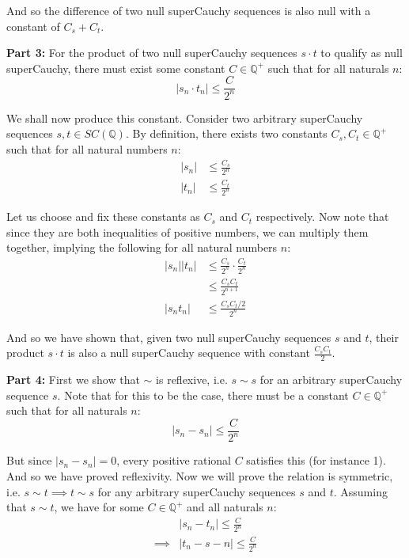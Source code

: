 \documentclass{article}
\begin{document}
And so the difference of two null superCauchy sequences is also null with a constant of $C_s+C_t$.
\bigskip

\noindent\textbf{Part 3:}  For the product of two null superCauchy sequences $s\cdot t$ to qualify as null superCauchy, there must exist some constant $C\in\mathbb Q^+$ such that for all naturals $n$:
\begin{equation*}
    |s_n\cdot t_n|\le\frac{C}{2^n}
\end{equation*}

We shall now produce this constant. Consider two arbitrary superCauchy sequences $s,t\in SC(\mathbb Q)$. By definition, there exists two constants $C_s,C_t\in\mathbb Q^+$ such that for all natural numbers $n$:
\setcounter{equation}{0}
\begin{align}
    |s_n|&\le\frac{C_s}{2^n}\\
    |t_n|&\le\frac{C_t}{2^n}
\end{align}

Let us choose and fix these constants as $C_s$ and $C_t$ respectively. Now note that since they are both inequalities of positive numbers, we can multiply them together, implying the following for all natural numbers $n$:
\begin{align*}
    |s_n||t_n|&\le\frac{C_s}{2^n}\cdot\frac{C_t}{2^n}\tag{product of (1) and (2)}\\
    &\le\frac{C_sC_t}{2^{n+1}}\\
    |s_nt_n|&\le\frac{C_sC_t/2}{2^{n}}\tag{product of absolute values}
\end{align*}

And so we have shown that, given two null superCauchy sequences $s$ and $t$, their product $s\cdot t$ is also a null superCauchy sequence with constant $\frac{C_sC_t}{2}$.
\bigskip

\noindent\textbf{Part 4:} First we show that $\sim$ is reflexive, i.e. $s\sim s$ for an arbitrary superCauchy sequence $s$. Note that for this to be the case, there must be a constant $C\in\mathbb Q^+$ such that for all naturals $n$:
\begin{equation*}
    |s_n-s_n|\le\frac{C}{2^n}
\end{equation*}

But since $|s_n-s_n|=0$, every positive rational $C$ satisfies this (for instance 1). And so we have proved reflexivity. Now we will prove the relation is symmetric, i.e. $s\sim t\implies t\sim s$ for any arbitrary superCauchy sequences $s$ and $t$. Assuming that $s\sim t$, we have for some $C\in\mathbb Q^+$ and all naturals $n$:
\begin{align*}
    &|s_n-t_n|\le\frac{C}{2^n}\\
    \implies&|t_n-s-n|\le\frac{C}{2^n}\tag{multiply by $-1$}
\end{align*}
\end{document}
